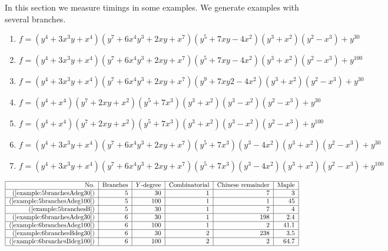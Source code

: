 \documentclass[a4paper,11pt]{amsart}%
\theoremstyle{definition}
\theoremstyle{plain}
\theoremstyle{remark}
\begin{document}
In this section we measure timings in some examples. We generate examples with several branches.

\begin{enumerate}
\item \label{example:5branchesAdeg30}$f = (y^4+3x^3y + x^4)(y^7 + 6x^4y^3 + 2xy + x^7)(y^5+7xy-4x^2)(y^3+x^2)(y^2-x^3)+y^{30}$
\item \label{example:5branchesAdeg100}$f = (y^4+3x^3y + x^4)(y^7 + 6x^4y^3 + 2xy + x^7)(y^5+7xy-4x^2)(y^3+x^2)(y^2-x^3)+y^{100}$
\item \label{example:5branchesB} $f = (y^4+3x^3y + x^4)(y^7 + 6x^4y^3 + 2xy + x^7)(y^9+7xy2-4x^2)(y^3+x^2)(y^2-x^3)+y^{30}$
\item \label{example:6branchesAdeg30} $f = (y^4+ x^4)(y^7 + 2xy + x^2)(y^5+7x^3)(y^3+x^2)(y^3-x^2)(y^2-x^3)+y^{30}$
\item \label{example:6branchesAdeg100} $f = (y^4+ x^4)(y^7 + 2xy + x^2)(y^5+7x^3)(y^3+x^2)(y^3-x^2)(y^2-x^3)+y^{100}$
\item \label{example:6branchesBdeg30} $f = (y^4+3x^3y + x^4)(y^7 + 6x^4y^3 + 2xy + x^7)(y^5+7x^3)(y^3-4x^2)(y^3+x^2)(y^2-x^3)+y^{30}$
\item \label{example:6branchesBdeg100} $f = (y^4+3x^3y + x^4)(y^7 + 6x^4y^3 + 2xy + x^7)(y^5+7x^3)(y^3-4x^2)(y^3+x^2)(y^2-x^3)+y^{100}$

\end{enumerate}

\[%
\begin{tabular}
[c]{|r|r|r|r|r|r|}\hline
No. & Branches & $Y$-degree & Combinatorial & Chinese remainder & Maple          \\ \hline
(\ref{example:5branchesAdeg30})   & 5 & $30$  & $1$   & $7$   & $3$       \\ \hline
(\ref{example:5branchesAdeg100})  & 5 & $100$ & $1$   & $1$   & $45$      \\ \hline
(\ref{example:5branchesB})        & 5 & $30$  & $1$   & $7$   & $4$       \\ \hline
(\ref{example:6branchesAdeg30})   & 6 & $30$  & $1$   & $198$ & $2.4$     \\ \hline
(\ref{example:6branchesAdeg100})  & 6 & $100$ & $1$   & $2$   & $41.1$    \\ \hline
(\ref{example:6branchesBdeg30})   & 6 & $30$  & $2$   & $238$ & $3.5$     \\ \hline
(\ref{example:6branchesBdeg100})  & 6 & $100$ & $2$   & $2$   & $64.7$    \\ \hline
\end{tabular}
\
\]
\end{document}

